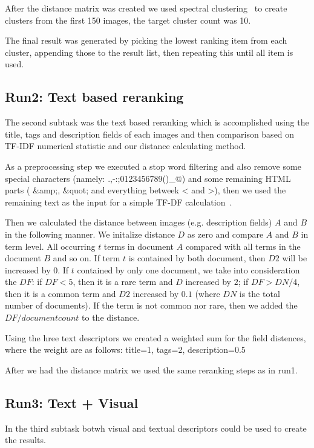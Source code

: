 \documentclass{sig-alternate}
\begin{document}
After the distance matrix was created we used spectral clustering~\cite{Ma2009,Ng01onspectral} to create clusters from the first 150 images, the target cluster count was 10. 

The final result was generated by picking the lowest ranking item from each cluster, appending those to the result list, then repeating this until all item is used.

\subsection{Run2: Text based reranking}
The second subtask was the text based reranking which is accomplished using the title, tags and description fields of each images and then comparison based on TF-IDF numerical statistic and our distance calculating method.

As a preprocessing step we executed a stop word filtering and also remove some special characters (namely: .,-:;0123456789()\_@) and some remaining HTML parts ( \&amp;, \&quot; and everything betweek < and >), then we used the remaining text as the input for a simple TF-DF calculation~\cite{Yeh2008}. 

Then we calculated the distance between images (e.g. description fields) $A$ and $B$ in the following manner. We initalize distance $D$ as zero and compare $A$ and $B$ in term level. All occurring $t$ terms in document $A$ compared with all terms in the document $B$ and so on. If term $t$ is contained by both document, then $D2$ will be increased by $0$. If $t$ contained by only one document, we take into consideration the $DF$: if $DF<5$, then it is a rare term and $D$ increased by $2$; if $DF>DN/4$, then it is a common term and  $D2$ increased by $0.1$ (where $DN$ is the total number of documents). If the term is not common nor rare, then we added the $DF/document count$ to the distance.

Using the hree text descriptors we created a weighted sum for the field distences, where the weight are as follows: title=1, tags=2, description=0.5

After we had the distance matrix we used the same reranking steps as in run1.

\subsection{Run3: Text + Visual}
In the third subtask botwh visual and textual descriptors could be used to create the results.
\end{document}
